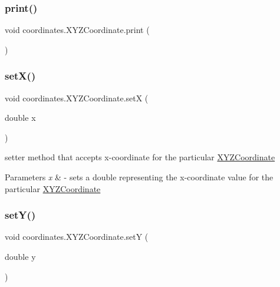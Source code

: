 \subsubsection{\texorpdfstring{print()}{print()}}
{\footnotesize\ttfamily void coordinates.\+X\+Y\+Z\+Coordinate.\+print (\begin{DoxyParamCaption}{ }\end{DoxyParamCaption})}

\mbox{\label{classcoordinates_1_1_x_y_z_coordinate_a38d36c730bd53179a0188d6d069f6400}} 
\subsubsection{\texorpdfstring{set\+X()}{setX()}}
{\footnotesize\ttfamily void coordinates.\+X\+Y\+Z\+Coordinate.\+setX (\begin{DoxyParamCaption}\item[{double}]{x }\end{DoxyParamCaption})}



setter method that accepts x-\/coordinate for the particular \hyperlink{classcoordinates_1_1_x_y_z_coordinate}{X\+Y\+Z\+Coordinate} 


\begin{DoxyParams}{Parameters}
{\em x} & -\/ sets a double representing the x-\/coordinate value for the particular \hyperlink{classcoordinates_1_1_x_y_z_coordinate}{X\+Y\+Z\+Coordinate} \\
\hline
\end{DoxyParams}
\mbox{\label{classcoordinates_1_1_x_y_z_coordinate_ae2af422b072d32e47eeef02520c74402}} 
\subsubsection{\texorpdfstring{set\+Y()}{setY()}}
{\footnotesize\ttfamily void coordinates.\+X\+Y\+Z\+Coordinate.\+setY (\begin{DoxyParamCaption}\item[{double}]{y }\end{DoxyParamCaption})}




